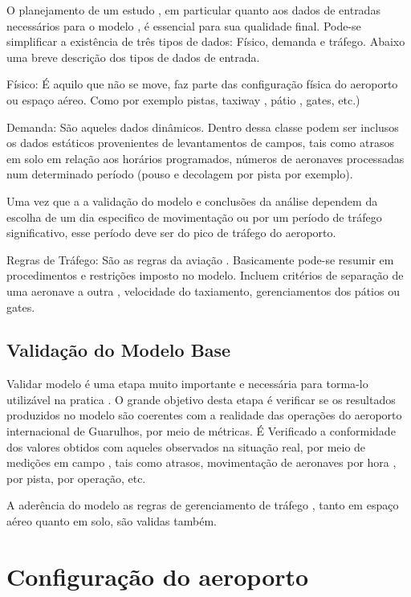 \documentclass[12pt]{article}
\begin{document}
O planejamento de um estudo , em particular quanto aos dados de entradas
necessários para o modelo , é essencial para sua qualidade final. Pode-se
simplificar a existência de três tipos de dados: Físico, demanda e tráfego. 
Abaixo uma breve descrição dos tipos de dados de entrada.

Físico: É aquilo que não se move, faz parte das configuração física do 
aeroporto ou espaço aéreo. Como por exemplo pistas, taxiway , pátio , gates,
 etc.)

Demanda: São aqueles dados dinâmicos. Dentro dessa classe podem ser inclusos os dados estáticos provenientes de levantamentos de campos, tais como
atrasos em solo em relação aos horários programados, números de aeronaves
processadas num determinado período (pouso e decolagem por pista por 
exemplo).

Uma vez que a a validação do modelo e conclusões da análise dependem da
escolha de um dia especifico de movimentação ou por um período de tráfego
significativo, esse período deve ser do pico de tráfego do aeroporto.

Regras de Tráfego: São as regras da aviação . Basicamente pode-se resumir
em procedimentos e restrições imposto no modelo. Incluem critérios de 
separação de uma aeronave a outra , velocidade do taxiamento, gerenciamentos
dos pátios ou gates.


\subsection{Validação do Modelo Base}
Validar modelo é uma etapa muito importante e necessária para torma-lo 
utilizável na pratica . O grande objetivo desta etapa é verificar se os
resultados produzidos no modelo são coerentes com a realidade das operações
do aeroporto internacional de Guarulhos, por meio de métricas. 
É Verificado a conformidade dos valores obtidos com aqueles observados na
situação real, por meio de medições em campo , tais como atrasos,
movimentação de aeronaves por hora , por pista, por operação, etc.

A aderência do modelo as regras de gerenciamento de tráfego , tanto em espaço
aéreo quanto em solo, são validas também.




\section{Configuração do aeroporto}
\end{document}
